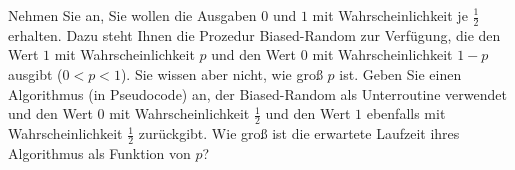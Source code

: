 
\begin{exercise}

\phantom{}
Nehmen Sie an, Sie wollen die Ausgaben $0$ und $1$ mit Wahrscheinlichkeit je $\frac{1}{2}$ erhalten.
Dazu steht Ihnen die Prozedur Biased-Random zur Verfügung, die den Wert $1$ mit Wahrscheinlichkeit $p$ und den Wert $0$ mit Wahrscheinlichkeit $1 - p$ ausgibt ($0 < p < 1$).
Sie wissen aber nicht, wie groß $p$ ist.
Geben Sie einen Algorithmus (in Pseudocode) an, der Biased-Random als Unterroutine verwendet und den Wert $0$ mit Wahrscheinlichkeit $\frac{1}{2}$ und den Wert $1$ ebenfalls mit Wahrscheinlichkeit $\frac{1}{2}$ zurückgibt.
Wie groß ist die erwartete Laufzeit ihres Algorithmus als Funktion von $p$?

\end{exercise}



